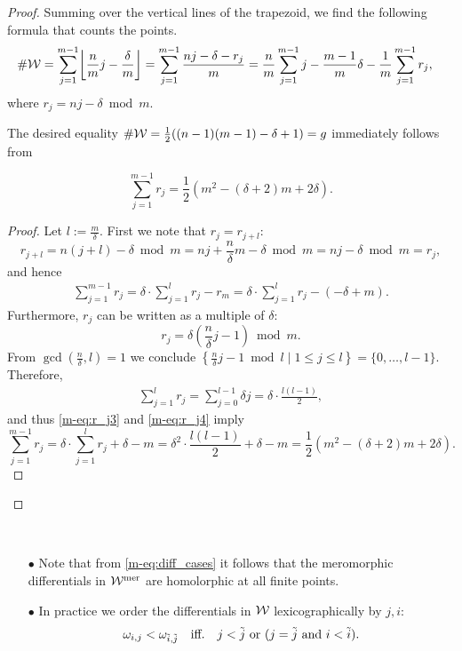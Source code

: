 \documentclass[main.tex]{subfiles}
\begin{document}
\begin{proof}
Summing over the vertical lines of the trapezoid, we find the following formula that counts the points.
     \begin{align}\label{eq:r_j}
 \#\W & = \sum_{j = 1}^{m-1} \floor*{\frac{n}{m}j - \frac{\delta}{m}} = \sum_{j = 1}^{m-1} \frac{nj-\delta-r_j}{m} =
  \frac{n}{m} \sum_{j=1}^{m-1} j - \frac{m-1}{m}\delta - \frac{1}{m} \sum_{j=1}^{m-1} r_j,
     \end{align}
      where $r_j = nj - \delta  \bmod m$.

The desired equality  $\#\mathcal{W} = \frac{1}{2}((n-1)(m-1)-\delta+1) = g$ immediately follows from
\begin{lemma}
      \begin{equation*}\label{eq:r_j2}
       \sum_{j=1}^{m-1} r_j = \frac{1}{2}(m^2 - (\delta+2)m + 2\delta).
      \end{equation*}
\end{lemma}
\begin{proof}\let\qed\relax
      Let $l := \frac{m}{\delta}$. First we note that $r_j = r_{j+l}$:
      $$r_{j+l} = n(j+l) - \delta  \bmod m = nj + \frac{n}{\delta}m - \delta  \bmod m =  nj - \delta  \bmod m =  r_j,$$
      and hence
      \begin{align}\label{eq:r_j3}
       \sum_{j=1}^{m-1} r_j = \delta \cdot \sum_{j=1}^{l} r_j - r_m = \delta \cdot \sum_{j=1}^{l} r_j - (-\delta + m).
      \end{align}
      Furthermore, $r_j$ can be written as a multiple of $\delta$:
      $$r_j = \delta \left(\frac{n}{\delta}j - 1\right)  \bmod m.$$
      From $\gcd(\frac{n}{\delta},l) = 1$ we conclude $\left\{  \frac{n}{\delta}j - 1  \bmod l  \mid  1 \le j \le l  \right\} = \{  0,\dots,l-1  \}$.
      Therefore,
      \begin{align}\label{eq:r_j4}
       \sum_{j = 1}^l r_j = \sum_{j = 0}^{l-1} \delta j = \delta \cdot \frac{l(l-1)}{2},
      \end{align}
      and thus \eqref{m-eq:r_j3} and \eqref{m-eq:r_j4} imply
      $$\sum_{j=1}^{m-1} r_j = \delta \cdot \sum_{j=1}^{l} r_j + \delta - m = \delta^2 \cdot \frac{l(l-1)}{2} + \delta - m = \frac{1}{2}(m^2 - (\delta+2)m + 2\delta).$$
\end{proof}
\end{proof}

\begin{rmk}\
    \begin{itemize}
     \item[$\bullet$] Note that from \eqref{m-eq:diff_cases} it follows that the meromorphic differentials in $\mathcal{W}^{\text{mer}}$ are homolorphic at all finite points.
     \item[$\bullet$] In practice we order the differentials in $\mathcal{W}$ lexicographically by $j,i$:
     $$\omega_{i,j} < \omega_{\tilde{i},\tilde{j}} \quad \text{iff.} \quad j < \tilde{j}  \text{ or } (j = \tilde{j} \text{ and } i < \tilde{i}).$$ 
    \end{itemize}
\end{rmk}

\biblio
\end{document}
